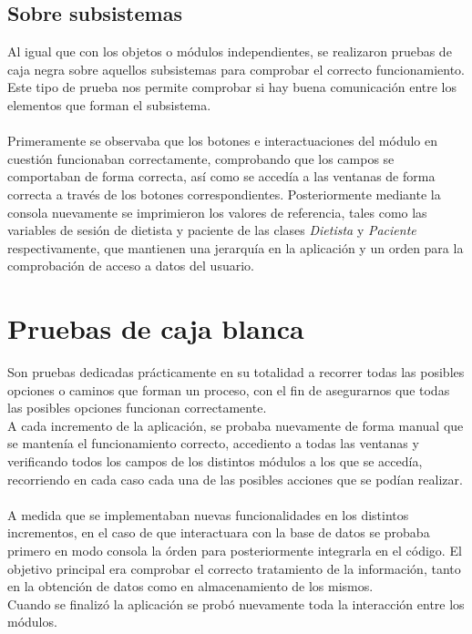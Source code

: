 \subsection{Sobre subsistemas}
Al igual que con los objetos o módulos independientes, se realizaron pruebas de caja negra sobre aquellos subsistemas para comprobar el correcto funcionamiento. Este tipo de prueba nos permite comprobar si hay buena comunicación entre los elementos que forman el subsistema.\\\\
Primeramente se observaba que los botones e interactuaciones del módulo en cuestión funcionaban correctamente, comprobando que los campos se comportaban de forma correcta, así como se accedía a las ventanas de forma correcta a través de los botones correspondientes. Posteriormente mediante la consola nuevamente se imprimieron los valores de referencia, tales como las variables de sesión de dietista y paciente de las clases \textit{Dietista} y \textit{Paciente} respectivamente, que mantienen una jerarquía en la aplicación y un orden para la comprobación de acceso a datos del usuario.

\section{Pruebas de caja blanca}
Son pruebas dedicadas prácticamente en su totalidad a recorrer todas las posibles opciones o caminos que forman un proceso, con el fin de asegurarnos que todas las posibles opciones funcionan correctamente.\\
A cada incremento de la aplicación, se probaba nuevamente de forma manual que se mantenía el funcionamiento correcto, accediento a todas las ventanas y verificando todos los campos de los distintos módulos a los que se accedía, recorriendo en cada caso cada una de las posibles acciones que se podían realizar.\\\\
A medida que se implementaban nuevas funcionalidades en los distintos incrementos, en el caso de que interactuara con la base de datos se probaba primero en modo consola la órden para posteriormente integrarla en el código. El objetivo principal era comprobar el correcto tratamiento de la información, tanto en la obtención de datos como en almacenamiento de los mismos.\\
Cuando se finalizó la aplicación se probó nuevamente toda la interacción entre los módulos.

